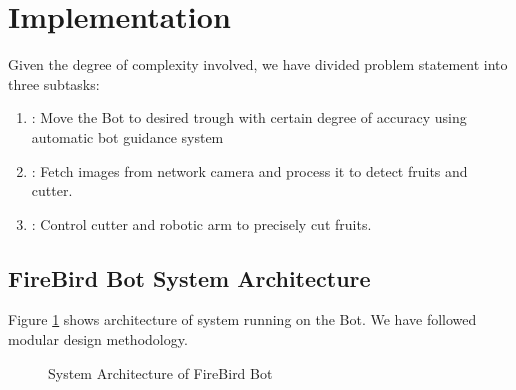 \documentclass[a4paper, 12pt]{article}
\begin{document}
\section{Implementation}
Given the degree of complexity involved, we have divided problem statement into three subtasks:
\begin{enumerate}
 \item[Task \#1]: Move the Bot to desired trough with certain degree of accuracy using automatic bot guidance system 
 \item[Task \#2]: Fetch images from network camera and process it to detect fruits and cutter.
 \item[Task \#3]: Control cutter and robotic arm to precisely cut fruits.
\end{enumerate}

\subsection{FireBird Bot System Architecture}
Figure \ref{fig-arch} shows architecture of system running on the Bot. We have followed modular design methodology.
\begin{figure}
 
 \caption{System Architecture of FireBird Bot}
 \label{fig-arch}
\end{figure}
\end{document}
